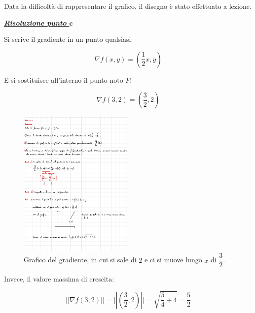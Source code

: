 \documentclass[a4paper]{article}
\begin{document}
	\noindent
	Data la difficoltà di rappresentare il grafico, il disegno è stato effettuato a lezione.
	
	\newpage
	
	\noindent
	\textcolor{Green4}{\textbf{\emph{\underline{Risoluzione punto $\boldsymbol{c}$}}}}\newline
	
	\noindent
	Si scrive il gradiente in un punto qualsiasi:
	
	\begin{equation*}
		\nabla f\left(x,y\right) = \left(\dfrac{1}{2}x, y\right)
	\end{equation*}

	\noindent
	E si sostituisce all'interno il punto noto $P$:
	
	\begin{equation*}
		\nabla f\left(3,2\right) = \left(\dfrac{3}{2}, 2\right)
	\end{equation*}

	\begin{figure}[!htp]
		\centering
		\includegraphics[width=0.5\textwidth]{img/lez15_ex1.pdf}
		\caption{Grafico del gradiente, in cui si sale di $2$ e ci si muove lungo $x$ di $\dfrac{3}{2}$.}
	\end{figure}

	\noindent
	Invece, il valore massima di crescita:
	
	\begin{equation*}
		\Big|\left|\nabla f\left(3,2\right)\right|\Big| = \Bigg|\left|\left(\dfrac{3}{2},2\right)\right|\Bigg| = \sqrt{\dfrac{5}{4} + 4} = \dfrac{5}{2}
	\end{equation*}

	\newpage
	
\end{document}
